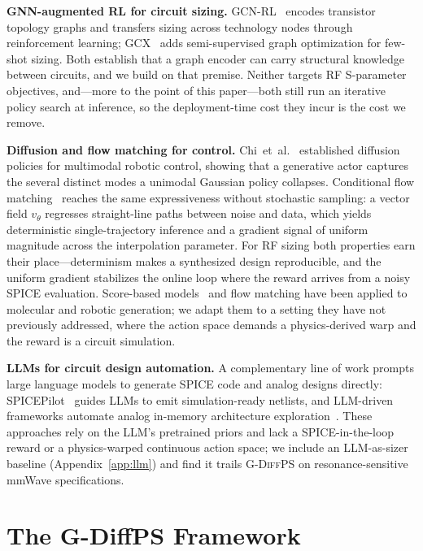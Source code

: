 \documentclass[sigconf,anonymous,review]{acmart}
\newcommand{\gdiffps}{\textsc{G-DiffPS}}
\begin{document}
\textbf{GNN-augmented RL for circuit sizing.}
GCN-RL~\cite{wang2020gcnrl} encodes transistor topology graphs and transfers
sizing across technology nodes through reinforcement learning; GCX~\cite{gcx2023}
adds semi-supervised graph optimization for few-shot sizing.  Both establish
that a graph encoder can carry structural knowledge between circuits, and we
build on that premise.  Neither targets RF S-parameter objectives, and---more
to the point of this paper---both still run an iterative policy search at
inference, so the deployment-time cost they incur is the cost we remove.

\textbf{Diffusion and flow matching for control.}
Chi~et~al.~\cite{chi2023diffusion} established diffusion policies for multimodal
robotic control, showing that a generative actor captures the several distinct
modes a unimodal Gaussian policy collapses.  Conditional flow
matching~\cite{lipman2023flow} reaches the same expressiveness without
stochastic sampling: a vector field $v_\theta$ regresses straight-line paths
between noise and data, which yields deterministic single-trajectory inference
and a gradient signal of uniform magnitude across the interpolation parameter.
For RF sizing both properties earn their place---determinism makes a synthesized
design reproducible, and the uniform gradient stabilizes the online loop where
the reward arrives from a noisy SPICE evaluation.  Score-based
models~\cite{song2019sde} and flow matching have been applied to molecular and
robotic generation; we adapt them to a setting they have not previously
addressed, where the action space demands a physics-derived warp and the reward
is a circuit simulation.

\textbf{LLMs for circuit design automation.}
A complementary line of work prompts large language models to generate SPICE
code and analog designs directly: SPICEPilot~\cite{spicepilot2024} guides LLMs
to emit simulation-ready netlists, and LLM-driven frameworks automate analog
in-memory architecture exploration~\cite{limca2025}.  These approaches rely on
the LLM's pretrained priors and lack a SPICE-in-the-loop reward or a
physics-warped continuous action space; we include an LLM-as-sizer baseline
(Appendix~\ref{app:llm}) and find it trails \gdiffps{} on resonance-sensitive
mmWave specifications.

\section{The G-DiffPS Framework}
\label{sec:framework}
\end{document}
